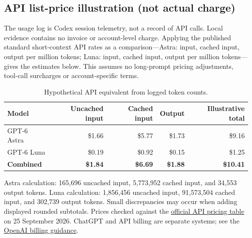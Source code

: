 \documentclass[10pt]{article}
\newcommand{\smallnote}[1]{{\small\color{muted}#1}}
\begin{document}
\subsection*{API list-price illustration (not actual charge)}
The usage log is Codex session telemetry, not a record of API calls. Local evidence contains no invoice or account-level charge. Applying the published standard short-context API rates as a comparison—Astra:  input,  cached input,  output per million tokens; Luna:  input,  cached input,  output per million tokens—gives the estimates below. This assumes no long-prompt pricing adjustments, tool-call surcharges or account-specific terms.

\begin{table}[ht]
\centering\small
\caption{Hypothetical API equivalent from logged token counts.}
\begin{tabular}{lrrrr}
\toprule
\textbf{Model} & \textbf{Uncached input} & \textbf{Cached input} & \textbf{Output} & \textbf{Illustrative total}\\
\midrule
GPT-6 Astra & \$1.66 & \$5.77 & \$1.73 & \$9.16\\
GPT-6 Luna & \$0.19 & \$0.92 & \$0.15 & \$1.25\\
\textbf{Combined} & \textbf{\$1.84} & \textbf{\$6.69} & \textbf{\$1.88} & \textbf{\$10.41}\\
\bottomrule
\end{tabular}
\end{table}
\smallnote{Astra calculation: 165,696 uncached input, 5,773,952 cached input, and 34,553 output tokens. Luna calculation: 1,856,456 uncached input, 91,573,504 cached input, and 302,739 output tokens. Small discrepancies may occur when adding displayed rounded subtotals. Prices checked against the \href{https://developers.openai.com/api/docs/pricing}{official API pricing table} on 25 September 2026. ChatGPT and API billing are separate systems; see the \href{https://help.openai.com/en/articles/9039756}{OpenAI billing guidance}.}
\end{document}
